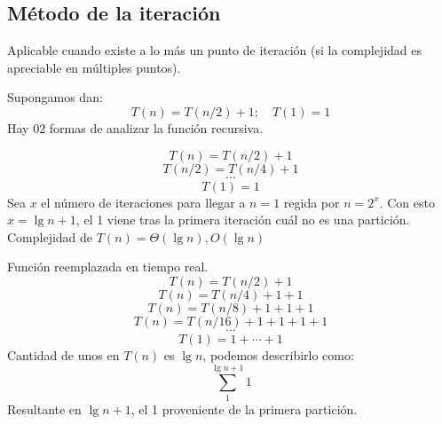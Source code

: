 \subsection{Método de la iteración}
Aplicable cuando existe a lo más un punto de iteración (si la complejidad es apreciable en múltiples puntos).

\begin{example}
	Supongamos dan:
	$$T(n)=T(n/2)+1;\quad T(1)=1$$
	Hay 02 formas de analizar la función recursiva.
	\begin{definition}
		$$T(n)=T(n/2)+1$$
		$$T(n/2)=T(n/4)+1$$
		$$\cdots$$
		$$T(1)=1$$
		Sea $x$ el número de iteraciones para llegar a $n=1$ regida por $n=2^x$.
		Con esto $x=\lg n +1$, el 1 viene tras la primera iteración cuál no es una partición.
		Complejidad de $T(n)=\Theta(\lg n), O(\lg n)$
	\end{definition}
	\begin{definition}
		Función reemplazada en tiempo real.
		$$ T(n)=T(n/2)+1 $$
		$$ T(n)=T(n/4)+1+1 $$
		$$ T(n)=T(n/8)+1+1+1 $$
		$$ T(n)=T(n/16)+1+1+1+1 $$
		$$ \cdots $$
		$$ T(1)=1+\cdots+1 $$
		Cantidad de unos en $T(n)$ es $\lg n$, podemos describirlo como:
		$$  \sum_1^{\lg n+1} 1  $$
		Resultante en $\lg n+1$, el 1 proveniente de la primera partición.
	\end{definition}
\end{example}

